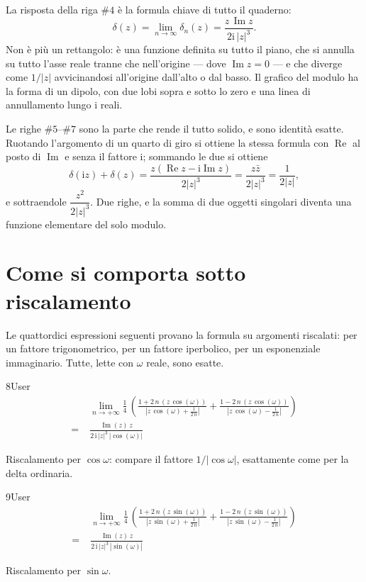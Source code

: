 La risposta della riga $\#4$ è la formula chiave di tutto il quaderno:
\[
  \delta(z)=\lim_{n\to\infty}\delta_n(z)=\frac{z\,\operatorname{Im}z}{2\mathrm{i}\,|z|^{3}}.
\]
Non è più un rettangolo: è una funzione definita su tutto il piano, che si annulla su tutto l'asse reale tranne che nell'origine — dove $\operatorname{Im}z=0$ — e che diverge come $1/|z|$ avvicinandosi all'origine dall'alto o dal basso. Il grafico del modulo ha la forma di un dipolo, con due lobi sopra e sotto lo zero e una linea di annullamento lungo i reali.

Le righe $\#5$--$\#7$ sono la parte che rende il tutto solido, e sono identità esatte. Ruotando l'argomento di un quarto di giro si ottiene la stessa formula con $\operatorname{Re}$ al posto di $\operatorname{Im}$ e senza il fattore $\mathrm{i}$; sommando le due si ottiene
\[
  \delta(\mathrm{i}z)+\delta(z)=\frac{z\left(\operatorname{Re}z-\mathrm{i}\operatorname{Im}z\right)}{2|z|^{3}}=\frac{z\bar z}{2|z|^{3}}=\frac{1}{2|z|},
\]
e sottraendole $\dfrac{z^2}{2|z|^{3}}$. Due righe, e la somma di due oggetti singolari diventa una funzione elementare del solo modulo.

\section{Come si comporta sotto riscalamento}

Le quattordici espressioni seguenti provano la formula su argomenti riscalati: per un fattore trigonometrico, per un fattore iperbolico, per un esponenziale immaginario. Tutte, lette con $\omega$ reale, sono esatte.

\begin{espr}{8}{User}{}
\begin{align*}
& \lim_{n \to +\infty} \frac{1}{4}\, \left(\frac{1 + 2\, n\, \left(z\, \cos\!\left(\omega\right)\right)}{\left|z\, \cos\!\left(\omega\right) + \frac{1}{2\, n}\right|} + \frac{1 - 2\, n\, \left(z\, \cos\!\left(\omega\right)\right)}{\left|z\, \cos\!\left(\omega\right) - \frac{1}{2\, n}\right|}\right) \\
=\;& \frac{\operatorname{Im}\!\left(z\right)\, z}{2\, \mathrm{i}\, \left|z\right|^{3}\, \left|\cos\!\left(\omega\right)\right|}
\end{align*}
\end{espr}
Riscalamento per $\cos\omega$: compare il fattore $1/|\cos\omega|$, esattamente come per la delta ordinaria.

\begin{espr}{9}{User}{}
\begin{align*}
& \lim_{n \to +\infty} \frac{1}{4}\, \left(\frac{1 + 2\, n\, \left(z\, \sin\!\left(\omega\right)\right)}{\left|z\, \sin\!\left(\omega\right) + \frac{1}{2\, n}\right|} + \frac{1 - 2\, n\, \left(z\, \sin\!\left(\omega\right)\right)}{\left|z\, \sin\!\left(\omega\right) - \frac{1}{2\, n}\right|}\right) \\
=\;& \frac{\operatorname{Im}\!\left(z\right)\, z}{2\, \mathrm{i}\, \left|z\right|^{3}\, \left|\sin\!\left(\omega\right)\right|}
\end{align*}
\end{espr}
Riscalamento per $\sin\omega$.

